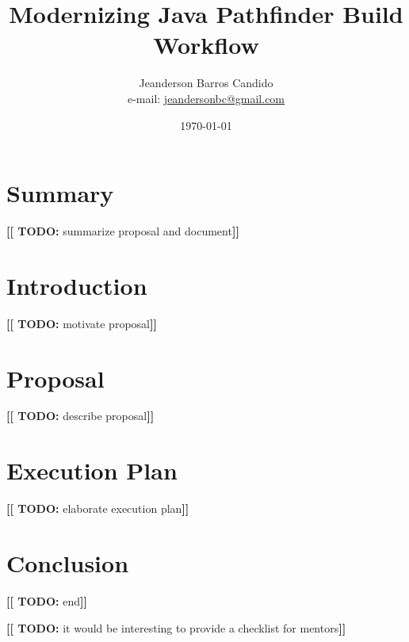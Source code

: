 \documentclass[a4paper, 12pt, twocolumn]{article}
\author{Jeanderson Barros Candido\\e-mail: \url{jeandersonbc@gmail.com}}
\title{Modernizing Java Pathfinder Build Workflow}
\date{\today}
\newcommand{\todo}[1]{\textbf{[[ TODO: }{\color{red} #1}\textbf{]]}}
\begin{document}
\maketitle

\section*{Summary}
\todo{summarize proposal and document}

\section*{Introduction}
\todo{motivate proposal}

\section*{Proposal}
\todo{describe proposal}

\section*{Execution Plan}
\todo{elaborate execution plan}

\section*{Conclusion}
\todo{end}

\todo{it would be interesting to provide a checklist for mentors}
\end{document}

